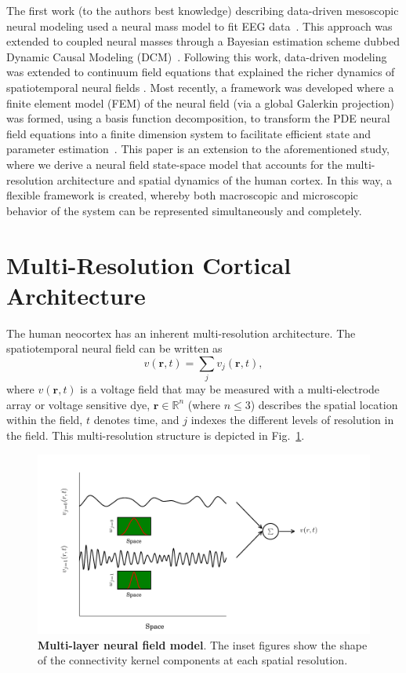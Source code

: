 \documentclass[review,authoryear,3p]{elsarticle}
\begin{document}
The first work (to the authors best knowledge) describing data-driven mesoscopic neural modeling used a neural mass model to fit EEG data~\citep{Valdes1999}. This approach was extended to coupled neural masses through a Bayesian estimation scheme dubbed Dynamic Causal Modeling (DCM)~\citep{David2003}. Following this work, data-driven modeling was extended to continuum field equations that explained the richer dynamics of spatiotemporal neural fields \citep{Galka2008,schiff2008kalman,Daunizeau2009}. Most recently, a framework was developed where a finite element model (FEM) of the neural field (via a global Galerkin projection) was formed, using a basis function decomposition, to transform the PDE neural field equations into a finite dimension system to facilitate efficient state and parameter estimation~\citep{Freestone2011}. This paper is an extension to the aforementioned study, where we derive a neural field state-space model that accounts for the multi-resolution architecture and spatial dynamics of the human cortex. In this way, a flexible framework is created, whereby both macroscopic and microscopic behavior of the system can be represented simultaneously and completely.

\section{Multi-Resolution Cortical Architecture}
The human neocortex has an inherent multi-resolution architecture. The spatiotemporal neural field can be written as 
\begin{equation}
	v\left(\mathbf{r},t\right) = \sum_{j} v_j\left(\mathbf{r},t\right),
\end{equation}
where $v\left(\mathbf{r},t\right)$ is a voltage field that may be measured with a multi-electrode array or voltage sensitive dye, $\mathbf{r}\in \mathbb{R}^n$ (where $n\le3$) describes the spatial location within the field, $t$ denotes time, and $j$ indexes the different levels of resolution in the field. This multi-resolution structure is depicted in Fig.~\ref{fig:MultiLayerFieldModel}.
\begin{figure}[t]
	\centering
		\includegraphics[scale=1]{./Graph/fig1.pdf}
	\caption{{\bf Multi-layer neural field model}. The inset figures show the shape of the
connectivity kernel components at each spatial resolution.}
	\label{fig:MultiLayerFieldModel}
\end{figure}
 
\end{document}
